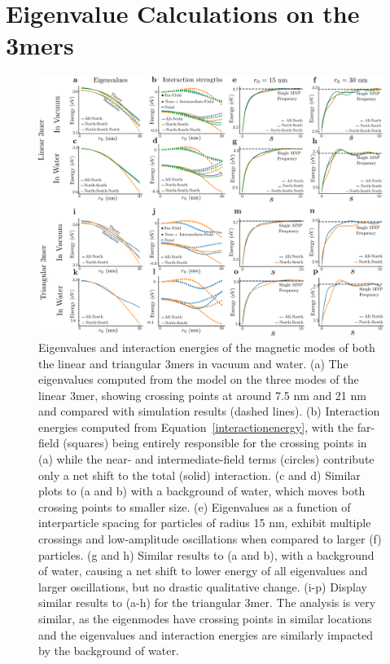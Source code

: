 \documentclass[journal=apchd5,manuscript=article]{achemso}
\begin{document}
\section{Eigenvalue Calculations on the 3mers}
\begin{figure}
\includegraphics[width=5in]{3mer_eig_combined.pdf}
\caption{Eigenvalues and interaction energies of the magnetic modes of both the linear and triangular 3mers in vacuum and water. (a) The eigenvalues computed from the model on the three modes of the linear 3mer, showing crossing points at around 7.5 nm and 21 nm and compared with simulation results (dashed lines). (b) Interaction energies computed from Equation~\ref{interactionenergy}, with the far-field (squares) being entirely responsible for the crossing points in (a) while the near- and intermediate-field terms (circles) contribute only a net shift to the total (solid) interaction. (c and d) Similar plots to (a and b) with a background of water, which moves both crossing points to smaller size. (e) Eigenvalues as a function of interparticle spacing for particles of radius 15 nm, exhibit multiple crossings and low-amplitude oscillations when compared to larger (f) particles. (g and h) Similar results to (a and b), with a background of water, causing a net shift to lower energy of all eigenvalues and larger oscillations, but no drastic qualitative change. (i-p) Display similar results to (a-h) for the triangular 3mer. The analysis is very similar, as the eigenmodes have crossing points in similar locations and the eigenvalues and interaction energies are similarly impacted by the background of water.}
\label{3mer_eig}
\end{figure}
\end{document}
